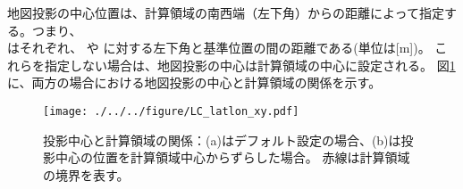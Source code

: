 地図投影の中心位置は、計算領域の南西端（左下角）からの距離によって指定する。つまり、\\
はそれぞれ、
\XDIR や \YDIR に対する左下角と基準位置の間の距離である(単位は[m])。
これらを指定しない場合は、地図投影の中心は計算領域の中心に設定される。
図\ref{fig:map_lc}に、両方の場合における地図投影の中心と計算領域の関係を示す。


\begin{figure}[t]
\begin{center}
  \texttt{[image: ./../../figure/LC\_latlon\_xy.pdf]}\\
  \caption{投影中心と計算領域の関係：(a)はデフォルト設定の場合、(b)は投影中心の位置を計算領域中心からずらした場合。
  赤線は計算領域の境界を表す。}
  \label{fig:map_lc}
\end{center}
\end{figure}
